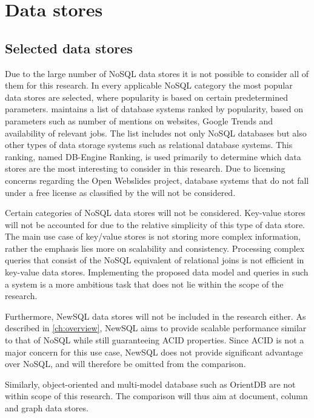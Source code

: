\chapter{Data stores}
\label{ch:data-stores}

\section{Selected data stores}
\label{sec:selected-data-stores}

Due to the large number of NoSQL data stores it is not possible to consider all of them for this research.
In every applicable NoSQL category the most popular data stores are selected, where popularity is based on certain predetermined parameters.
\textcite{DBEngine2018} maintains a list of database systems ranked by popularity, based on parameters such as number of mentions on websites, Google Trends and availability of relevant jobs.
The list includes not only NoSQL databases but also other types of data storage systems such as relational database systems.
This ranking, named DB-Engine Ranking, is used primarily to determine which data stores are the most interesting to consider in this research.
Due to licensing concerns regarding the Open Webslides project, database systems that do not fall under a free license as classified by the \textcite{FreeSoftwareFoundation1985} will not be considered.

Certain categories of NoSQL data stores will not be considered.
Key-value stores will not be accounted for due to the relative simplicity of this type of data store.
The main use case of key/value stores is not storing more complex information, rather the emphasis lies more on scalability and consistency.
Processing complex queries that consist of the NoSQL equivalent of relational joins is not efficient in key-value data stores.
Implementing the proposed data model and queries in such a system is a more ambitious task that does not lie within the scope of the research.

Furthermore, NewSQL data stores will not be included in the research either.
As described in \cref{ch:overview}, NewSQL aims to provide scalable performance similar to that of NoSQL while still guaranteeing ACID properties.
Since ACID is not a major concern for this use case, NewSQL does not provide significant advantage over NoSQL, and will therefore be omitted from the comparison.

Similarly, object-oriented and multi-model database such as OrientDB \autocite{OrientDB2010} are not within scope of this research.
The comparison will thus aim at document, column and graph data stores.

